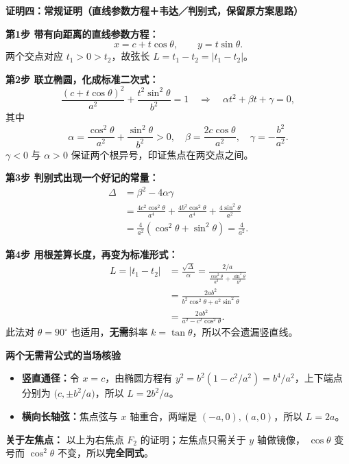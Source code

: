\begin{proofbox}
\textbf{\textcolor{CProof}{证明四：常规证明（直线参数方程＋韦达／判别式，保留原方案思路）}}

\textbf{第1步 带有向距离的直线参数方程：}
\[
 x=c+t\cos\theta,\qquad y=t\sin\theta.
\]
两个交点对应 $t_1>0>t_2$，故弦长 $L=t_1-t_2=|t_1-t_2|$。

\textbf{第2步 联立椭圆，化成标准二次式：}
\[
 \frac{(c+t\cos\theta)^2}{a^2}
 +\frac{t^2\sin^2\theta}{b^2}=1
 \quad\Longrightarrow\quad
 \alpha t^2+\beta t+\gamma=0,
\]
其中
\[
 \alpha=\frac{\cos^2\theta}{a^2}+\frac{\sin^2\theta}{b^2}>0,
 \quad \beta=\frac{2c\cos\theta}{a^2},
 \quad \gamma=-\frac{b^2}{a^2}.
\]
$\gamma<0$ 与 $\alpha>0$ 保证两个根异号，印证焦点在两交点之间。

\textbf{第3步 判别式出现一个好记的常量：}
\[
\begin{aligned}
 \Delta&=\beta^2-4\alpha\gamma\\
 &=\frac{4c^2\cos^2\theta}{a^4}
   +\frac{4b^2\cos^2\theta}{a^4}
   +\frac{4\sin^2\theta}{a^2}\\
 &=\frac4{a^2}(\cos^2\theta+\sin^2\theta)
 =\boxed{\frac4{a^2}}.
\end{aligned}
\]

\textbf{第4步 用根差算长度，再变为标准形式：}
\[
\begin{aligned}
 L=|t_1-t_2|
 &=\frac{\sqrt\Delta}{\alpha}
 =\frac{2/a}{\frac{\cos^2\theta}{a^2}+\frac{\sin^2\theta}{b^2}}\\
 &=\frac{2ab^2}{b^2\cos^2\theta+a^2\sin^2\theta}\\
 &=\boxed{\frac{2ab^2}{a^2-c^2\cos^2\theta}}.
\end{aligned}
\]
此法对 $\theta=90^\circ$ 也适用，\textbf{无需}斜率 $k=\tan\theta$，所以不会遗漏竖直线。

\medskip
\textbf{\textcolor{CProof}{两个无需背公式的当场核验}}

\begin{itemize}[leftmargin=*,itemsep=0.4em,topsep=0.35em]
 \item \textbf{竖直通径：}令 $x=c$，由椭圆方程有
 $y^2=b^2(1-c^2/a^2)=b^4/a^2$，上下端点分别为
 $\bigl(c,\pm b^2/a\bigr)$，所以 $L=2b^2/a$。
 \item \textbf{横向长轴弦：}焦点弦与 $x$ 轴重合，两端是 $(-a,0),(a,0)$，所以 $L=2a$。
\end{itemize}

\textbf{\textcolor{CProof}{关于左焦点：}}
以上为右焦点 $F_2$ 的证明；左焦点只需关于 $y$ 轴做镜像，
$\cos\theta$ 变号而 $\cos^2\theta$ 不变，所以\textbf{完全同式}。

\end{proofbox}
